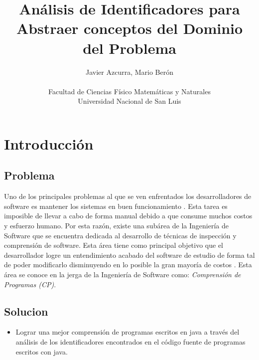 \documentclass[12pt]{report}
\title{Análisis de Identificadores para Abstraer conceptos del Dominio del Problema}
\author{Javier Azcurra, Mario Berón\\\\Facultad de Ciencias Físico Matemáticas y Naturales\\Universidad Nacional de San Luis}
\begin{document}
\maketitle

\begin{abstract}
\end{abstract}

\chapter{Introducción}
\section{Problema}

Uno de los principales problemas al que se ven enfrentados los desarrolladores de 
software es mantener los sistemas en buen funcionamiento \cite{vonmayrhauser1995pcd}. 
Esta tarea es imposible de llevar a cabo de forma manual debido a que consume 
muchos costos y esfuerzo humano. 
Por esta razón, existe una subárea de la Ingeniería de Software que se encuentra 
dedicada al desarrollo de técnicas de inspección y comprensión de software. 
Esta área tiene como principal objetivo que el desarrollador logre un entendimiento 
acabado del software de estudio de forma tal de poder modificarlo disminuyendo en 
lo posible la gran mayoría de costos \cite{BRM10}. 
Esta área se conoce en la jerga de la Ingeniería de Software como: 
\textit{Comprensión de Programas (CP)}.



\section{Solucion}
\begin{itemize}
\item Lograr una mejor comprensión de programas escritos en java a través del análisis de los identificadores encontrados en el código fuente de programas escritos con java.
\end{itemize}





\end{document}
